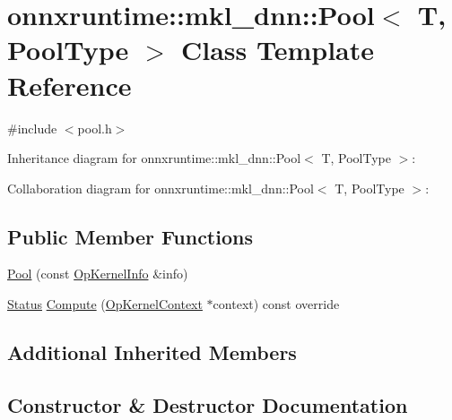 \hypertarget{classonnxruntime_1_1mkl__dnn_1_1Pool}{}\section{onnxruntime\+:\+:mkl\+\_\+dnn\+:\+:Pool$<$ T, Pool\+Type $>$ Class Template Reference}
\label{classonnxruntime_1_1mkl__dnn_1_1Pool}


{\ttfamily \#include $<$pool.\+h$>$}



Inheritance diagram for onnxruntime\+:\+:mkl\+\_\+dnn\+:\+:Pool$<$ T, Pool\+Type $>$\+:


Collaboration diagram for onnxruntime\+:\+:mkl\+\_\+dnn\+:\+:Pool$<$ T, Pool\+Type $>$\+:
\subsection*{Public Member Functions}
\begin{DoxyCompactItemize}
\item 
\mbox{\hyperlink{classonnxruntime_1_1mkl__dnn_1_1Pool_a893dd85810a0f944b3a54a75dabcd1be}{Pool}} (const \mbox{\hyperlink{classonnxruntime_1_1OpKernelInfo}{Op\+Kernel\+Info}} \&info)
\item 
\mbox{\hyperlink{classonnxruntime_1_1common_1_1Status}{Status}} \mbox{\hyperlink{classonnxruntime_1_1mkl__dnn_1_1Pool_aff8a05a3aec92d9e68b366ead56de08f}{Compute}} (\mbox{\hyperlink{classonnxruntime_1_1OpKernelContext}{Op\+Kernel\+Context}} $\ast$context) const override
\end{DoxyCompactItemize}
\subsection*{Additional Inherited Members}


\subsection{Constructor \& Destructor Documentation}
\mbox{\label{classonnxruntime_1_1mkl__dnn_1_1Pool_a893dd85810a0f944b3a54a75dabcd1be}} 
